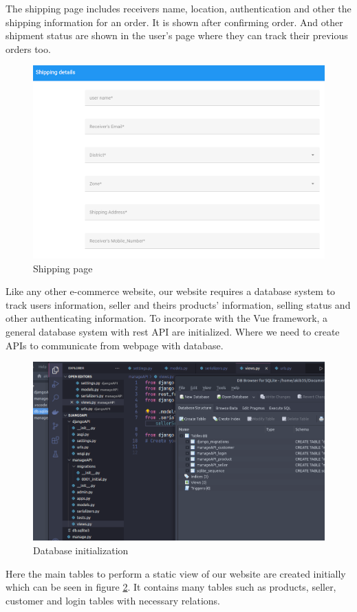 \documentclass[a4paper,12pt]{report}
\begin{document}
The shipping page includes receivers name, location, authentication and other the shipping information for an order. It is shown after confirming order. And other shipment status are shown in the user's page where they can track their previous orders too.
\begin{figure}[H]
\centering
\includegraphics[keepaspectratio, width=12cm]{shipping.png}
\caption{Shipping page}
\label{shipping}
\end{figure}
Like any other e-commerce website, our website requires a database system to track users information, seller and theirs products' information, selling status and other authenticating information. To incorporate with the Vue framework, a general database system with rest API are initialized. Where we need to create APIs to communicate from webpage with database.
\begin{figure}[H]
\centering
\includegraphics[keepaspectratio, width=12cm]{db.png}
\caption{Database initialization}
\label{db}
\end{figure}
Here the main tables to perform a static view of our website are created initially which can be seen in figure \ref{db}. It contains many tables such as products, seller, customer and login tables with necessary relations.
\end{document}
